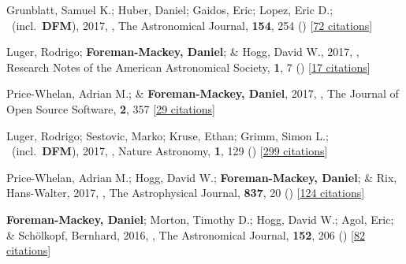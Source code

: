 \item[{\color{numcolor}\scriptsize29}] Grunblatt, Samuel K.; Huber, Daniel; Gaidos, Eric; Lopez, Eric D.; \etal\ (incl.\ \textbf{DFM}), 2017, , The Astronomical Journal, \textbf{154}, 254 () [\href{https://ui.adsabs.harvard.edu/abs/2017AJ....154..254G}{72 citations}]

\item[{\color{numcolor}\scriptsize28}] Luger, Rodrigo; \textbf{Foreman-Mackey, Daniel}; \& Hogg, David W., 2017, , Research Notes of the American Astronomical Society, \textbf{1}, 7 () [\href{https://ui.adsabs.harvard.edu/abs/2017RNAAS...1....7L}{17 citations}]

\item[{\color{numcolor}\scriptsize27}] Price-Whelan, Adrian M.; \& \textbf{Foreman-Mackey, Daniel}, 2017, , The Journal of Open Source Software, \textbf{2}, 357 [\href{https://ui.adsabs.harvard.edu/abs/2017JOSS....2..357P}{29 citations}]

\item[{\color{numcolor}\scriptsize26}] Luger, Rodrigo; Sestovic, Marko; Kruse, Ethan; Grimm, Simon L.; \etal\ (incl.\ \textbf{DFM}), 2017, , Nature Astronomy, \textbf{1}, 129 () [\href{https://ui.adsabs.harvard.edu/abs/2017NatAs...1E.129L}{299 citations}]

\item[{\color{numcolor}\scriptsize25}] Price-Whelan, Adrian M.; Hogg, David W.; \textbf{Foreman-Mackey, Daniel}; \& Rix, Hans-Walter, 2017, , The Astrophysical Journal, \textbf{837}, 20 () [\href{https://ui.adsabs.harvard.edu/abs/2017ApJ...837...20P}{124 citations}]

\item[{\color{numcolor}\scriptsize24}] \textbf{Foreman-Mackey, Daniel}; Morton, Timothy D.; Hogg, David W.; Agol, Eric; \& Sch{\"o}lkopf, Bernhard, 2016, , The Astronomical Journal, \textbf{152}, 206 () [\href{https://ui.adsabs.harvard.edu/abs/2016AJ....152..206F}{82 citations}]

